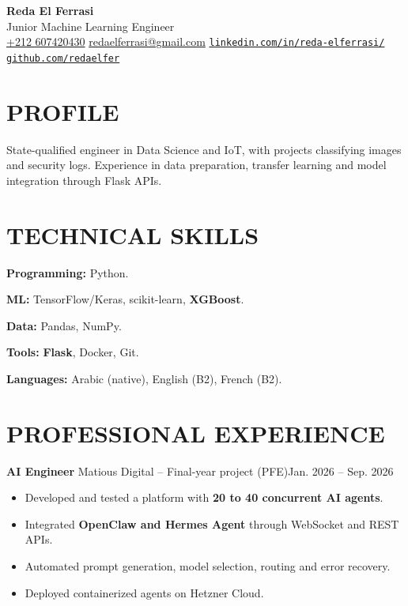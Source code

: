 \documentclass[11pt,a4paper]{article}
\newcommand{\entry}[2]{\noindent #1\hfill #2\par}
\begin{document}
\begin{center}
  {\LARGE\bfseries Reda El Ferrasi}\\[3pt]
  {\large Junior Machine Learning Engineer}\\[5pt]
  {\small
    \href{tel:+212607420430}{+212 607420430}
    \enspace\textbar{}\enspace
    \href{mailto:redaelferrasi@gmail.com}{redaelferrasi@gmail.com}
    \enspace\textbar{}\enspace
    \href{https://www.linkedin.com/in/reda-elferrasi/}{\nolinkurl{linkedin.com/in/reda-elferrasi/}}
    \enspace\textbar{}\enspace
    \href{https://github.com/redaelfer}{\nolinkurl{github.com/redaelfer}}
  }
\end{center}
\vspace{-5pt}


\section*{PROFILE}
State-qualified engineer in Data Science and IoT, with projects classifying images and security logs. Experience in data preparation, transfer learning and model integration through Flask APIs.

\section*{TECHNICAL SKILLS}
\textbf{Programming:} Python.\par
\textbf{ML:} TensorFlow/Keras, scikit-learn, \textbf{XGBoost}.\par
\textbf{Data:} Pandas, NumPy.\par
\textbf{Tools:} \textbf{Flask}, Docker, Git.\par
\textbf{Languages:} Arabic (native), English (B2), French (B2).

\section*{PROFESSIONAL EXPERIENCE}

\entry{\textbf{AI Engineer} \textbar{} Matious Digital -- Final-year project (PFE)}{Jan. 2026 -- Sep. 2026}
\begin{itemize}
  \item Developed and tested a platform with \textbf{20 to 40 concurrent AI agents}.
  \item Integrated \textbf{OpenClaw and Hermes Agent} through WebSocket and REST APIs.
  \item Automated prompt generation, model selection, routing and error recovery.
  \item Deployed containerized agents on Hetzner Cloud.
\end{itemize}
\end{document}
